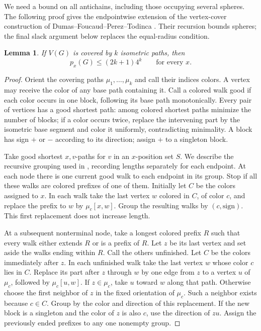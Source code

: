 \documentclass[11pt]{article}
\newtheorem{lemma}[theorem]{Lemma}
\theoremstyle{remark}\newtheorem{remark}[theorem]{Remark}
\begin{document}
We need a bound on all antichains, including those occupying several spheres.
The following proof gives the endpointwise extension of the vertex-cover
construction of Dumas--Foucaud--Perez--Todinca
\cite[Section 4, proof of Lemma 8]{cover}. Their recursion bounds spheres;
the final slack argument below replaces the equal-radius condition.

\begin{lemma}\label{lem:coverbound}
If $V(G)$ is covered by $k$ isometric paths, then
\[
 p_x(G)\le(2k+1)4^k\qquad\text{for every }x.
\]
\end{lemma}
\begin{proof}
Orient the covering paths $\mu_1,\ldots,\mu_k$ and call their indices colors.
A vertex may receive the color of any base path containing it. Call a colored
walk good if each color occurs in one block, following its base path
monotonically. Every pair of vertices has a good shortest path: among colored
shortest paths minimize the number of blocks; if a color occurs twice,
replace the intervening part by the isometric base segment and color it
uniformly, contradicting minimality. A block has sign $+$ or $-$ according
to its direction; assign $+$ to a singleton block.

Take good shortest $x,v$-paths for $v$ in an $x$-position set $S$. We describe
the recursive grouping used in \cite{cover}, recording lengths separately
for each endpoint. At each node there is one current good walk to each
endpoint in its group. Stop if all these walks are colored prefixes of one
of them. Initially let $C$ be the colors assigned to $x$. In each walk take
the last vertex $w$ colored in $C$, of color $c$, and replace the prefix to
$w$ by $\mu_c[x,w]$. Group the resulting walks by $(c,\text{sign})$.
This first replacement does not increase length.

At a subsequent nonterminal node, take a longest colored prefix $R$ such that
every walk either extends $R$ or is a prefix of $R$. Let $z$ be its last vertex
and set aside the walks ending within $R$. Call the others unfinished.
Let $C$ be the colors immediately after $z$. In each unfinished
walk take the last vertex $w$ whose color $c$ lies in $C$. Replace its part
after $z$ through $w$ by one edge from $z$ to a vertex $u$ of $\mu_c$, followed
by $\mu_c[u,w]$. If $z\in\mu_c$, take $u$ toward $w$ along that path.
Otherwise choose the first neighbor of $z$ in the fixed orientation of
$\mu_c$. Such a neighbor exists because $c\in C$.
Group by the color and direction of this replacement. If the new block is
a singleton and the color of $z$ is also $c$, use the direction of $zu$.
Assign the previously ended prefixes to any one nonempty group.


\end{proof}
\end{document}

